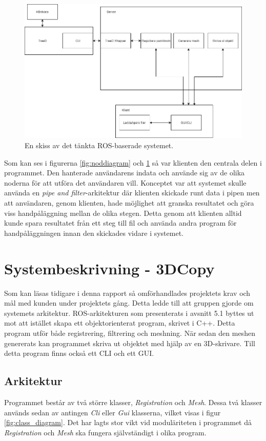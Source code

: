 \begin{figure}[H]
	\centering
	\includegraphics[width=130mm]{figures/Systemskiss_gamla.png}
	\caption{En skiss av det tänkta ROS-baserade systemet.}
	\label{fig:systembeskrivning_gamla}
\end{figure}

Som kan ses i figurerna \ref{fig:noddiagram} och \ref{fig:systembeskrivning_gamla} så var klienten den centrala delen i programmet. Den hanterade användarens indata och använde sig av de olika noderna för att utföra det användaren vill. Konceptet var att systemet skulle använda en \textit{pipe and filter}-arkitektur där klienten skickade runt data i pipen men att användaren, genom klienten, hade möjlighet att granska resultatet och göra viss handpåläggning mellan de olika stegen. Detta genom att klienten alltid kunde spara resultatet från ett steg till fil och använda andra program för handpåläggningen innan den skickades vidare i systemet.

\section{Systembeskrivning - 3DCopy}

Som kan läsas tidigare i denna rapport så omförhandlades projektets krav och mål med kunden under projektets gång. Detta ledde till att gruppen gjorde om systemets arkitektur. ROS-arkitekturen som presenterats i avsnitt 5.1 byttes ut mot att istället skapa ett objektorienterat program, skrivet i C++. Detta program utför både registrering, filtrering och meshning. När sedan den meshen genererats kan programmet skriva ut objektet med hjälp av en 3D-skrivare. Till detta program finns också ett CLI och ett GUI.

\subsection{Arkitektur}
Programmet består av två större klasser, \textit{Registration} och \textit{Mesh}. Dessa två klasser används sedan av antingen \textit{Cli}  eller \textit{Gui} klasserna, vilket visas i figur \ref{fig:class_diagram}.  Det har lagts stor vikt vid moduläriteten i programmet då \textit{Registration} och \textit{Mesh} ska fungera självständigt i olika program.

